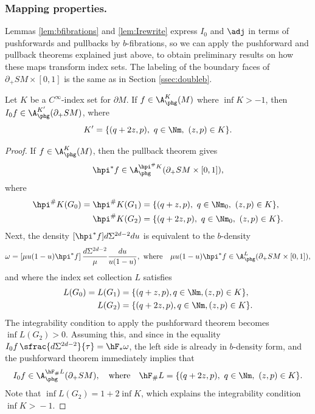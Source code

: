 \subsubsection*{Mapping properties.} Lemmas \ref{lem:bfibrations} and \ref{lem:Irewrite} express $I_0$ and $\adj $ in terms of pushforwards and pullbacks by $b$-fibrations, so we can apply the pushforward and pullback theorems explained just above, to obtain preliminary results on how these maps transform index sets. The labeling of the boundary faces of $\partial_+ SM\times [0,1]$ is the same as in Section \ref{ssec:doubleb}.

\begin{Lemma}\label{lem:xray}
Let $K$ be a $C^\infty$-index set for $\partial M$. If $f\in \A_{\phg}^K (M)$ where $\inf K >-1$, then $I_0 f \in \A_{\phg}^{K'}(\partial_+ SM)$, where\vspace*{-3pt}
\begin{equation*}
K' = \{(q + 2z, p),\ q\in \Nm,\ (z,p)\in K\}.
\end{equation*}
\end{Lemma}
\begin{proof}
If $f\in \A_{\phg}^K(M)$, then the pullback theorem gives\vspace*{-3pt}
\begin{equation*}
\hpi^* f \in \A_{\phg}^{\hpi^\# K}(\partial_+ SM\times [0,1]),
\end{equation*}
where\vspace*{-3pt}
\begin{align*}
\hpi^\# K (G_0) = \hpi^\# K (G_1) &= \{(q + z, p),\ q\in \Nm_0,\ (z,p)\in K\},\\
\hpi^\# K (G_2) &= \{(q + 2z, p),\ q\in \Nm_0,\ (z,p)\in K\}.
\end{align*}
Next, the density $[\hpi^* f]d\Sigma^{2d-2} du$ is equivalent to the $b$-density\vspace*{-3pt}
\begin{equation*}
\omega = [\mu u(1-u) \hpi^* f]\, \frac{d\Sigma^{2d-2}}{\mu} \frac{du}{u(1-u)}, \ \text{where} \quad \mu u(1-u) \hpi^* f \in \A_{\phg}^L (\partial_+ SM \times [0,1]),
\end{equation*}
and where the index set collection $L$ satisfies\vspace*{-3pt}
\begin{align*}
L(G_0) = L(G_1) &= \{(q + z, p), q\in \Nm, (z,p)\in K\}, \\
L(G_2) &= \{(q + 2z, p), q\in \Nm, (z,p)\in K\}.
\end{align*}
The integrability condition to apply the pushforward theorem becomes $\inf L(G_2) > 0$. Assuming this, and since in the equality $I_0 f\, \sfrac{d\Sigma^{2d-2}}{\tau} = \hF_* \omega$, the left side is already in $b$-density form, and the pushforward theorem immediately implies that
\begin{equation*}
I_0 f \in \A_{\phg}^{\hF_\# L} (\partial_+ SM), \quad \text{where} \quad \hF_\# L = \{(q + 2z, p),\ q\in \Nm,\ (z,p)\in K\}.
\end{equation*}
Note that $\inf L(G_2) \!=\! 1 + 2 \inf K$, which explains the integrability condition \hbox{$\inf K \!>\! -1$}.
\end{proof}

